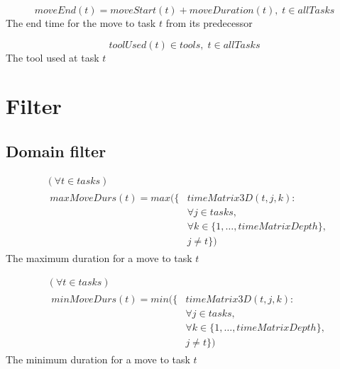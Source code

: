 \documentclass[10pt,a4paper]{report}
\begin{document}
\begin{equation}\label{eq:51}
moveEnd(t) = moveStart(t) + moveDuration(t), \; t \in allTasks\end{equation}
The end time for the move to task $t$ from its predecessor

\begin{equation}\label{eq:52}
toolUsed(t) \in tools, \; t \in allTasks\end{equation}
The tool used at task $t$


\section*{Filter}
\subsection*{Domain filter}

\begin{equation}
\begin{aligned}\label{eq:57}
&( \forall t \in tasks)\\
&\begin{aligned}
maxMoveDurs(t) = max(\{&timeMatrix3D(t,j,k) :\\
&\forall j \in tasks, \\
&\forall k \in \{1 , \ldots , timeMatrixDepth\},\\
&j \neq t\})
\end{aligned}
\end{aligned}
\end{equation}
The maximum duration for a move to task $t$


\begin{equation}
\begin{aligned}\label{eq:58}
&(\forall t \in tasks)\\
&\begin{aligned}
minMoveDurs(t) = min(\{&timeMatrix3D(t,j,k) :\\
&\forall j \in tasks, \\
&\forall k \in \{1 , \ldots , timeMatrixDepth\},\\
&j \neq t\})
\end{aligned}
\end{aligned}
\end{equation}
The minimum duration for a move to task $t$
\end{document}
